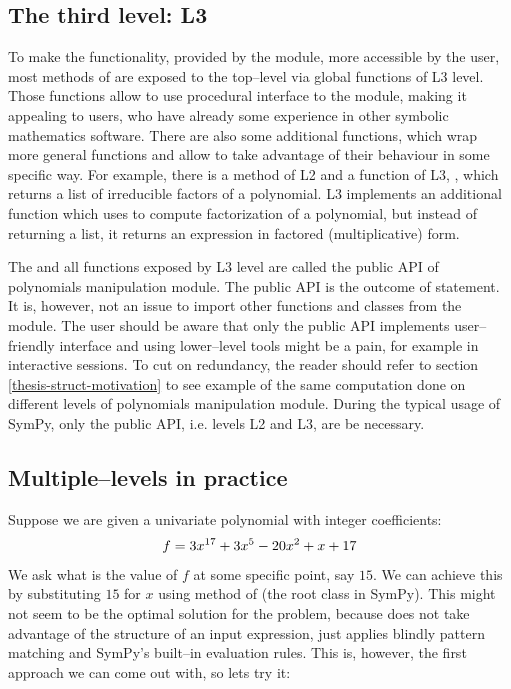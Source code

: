 \subsection{The third level: L3}

To make the functionality, provided by the module, more accessible by the user, most methods of
 are exposed to the top--level via global functions of L3 level. Those functions
allow to use procedural interface to the module, making it appealing to users, who have already
some experience in other symbolic mathematics software. There are also some additional functions,
which wrap more general functions and allow to take advantage of their behaviour in some specific
way. For example, there is a method of L2 and a function of L3, , which returns
a list of irreducible factors of a polynomial. L3 implements an additional function 
which uses  to compute factorization of a polynomial, but instead of returning
a list, it returns an expression in factored (multiplicative) form.

The  and all functions exposed by L3 level are called the public API of polynomials
manipulation module. The public API is the outcome of  statement. It
is, however, not an issue to import other functions and classes from the module. The user should
be aware that only the public API implements user--friendly interface and using lower--level tools
might be a pain, for example in interactive sessions. To cut on redundancy, the reader should refer
to section \ref{thesis-struct-motivation} to see example of the same computation done on different
levels of polynomials manipulation module. During the typical usage of SymPy, only the public API,
i.e. levels L2 and L3, are be necessary.


\subsection{Multiple--levels in practice}

Suppose we are given a univariate polynomial with integer coefficients:
\begin{gather}
\begin{split}f = 3 x^{17} + 3 x^5 - 20 x^2 + x + 17\end{split}\notag
\end{gather}
We ask what is the value of $f$ at some specific point, say $15$. We can achieve this by
substituting $15$ for $x$ using  method of  (the root class in SymPy).
This might not seem to be the optimal solution for the problem, because  does not
take advantage of the structure of an input expression, just applies blindly pattern matching
and SymPy's built--in evaluation rules. This is, however, the first approach we can come out
with, so lets try it:

